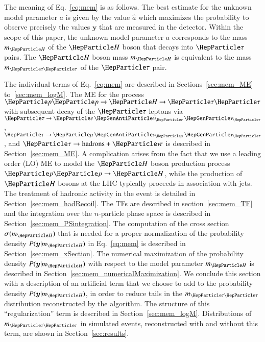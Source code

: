 The meaning of Eq.~\ref{eq:mem} is as follows.
The best estimate for the unknown model parameter $a$ is given by the
value $\hat{a}$ which maximizes the probability to observe precisely the 
values $\bm{y}$ that are measured in the detector. 
Within the scope of this paper, the unknown model parameter $a$
corresponds to the mass $m_{\PHiggs}$ of the $\PHiggs$ boson that decays into $\Pgt$ pairs.
The $\PHiggs$ boson mass $m_{\PHiggs}$ is equivalent to the mass $m_{\Pgt\Pgt}$ of the $\Pgt$ pair.

The individual terms of Eq.~\ref{eq:mem} are described in
Sections~\ref{sec:mem_ME} to~\ref{sec:mem_logM}.
The ME for the process $\Pp\Pp \to \PHiggs \to \Pgt\Pgt$
with subsequent decay of the $\Pgt$ leptons 
via $\Pgt \to \enunu$, $\Pgt \to \mununu$, and $\Pgt \to \textrm{hadrons} + \Pnut$
is described in Section~\ref{sec:mem_ME}.
A complication arises from the fact that we use a leading order (LO)
ME to model the $\PHiggs$ boson production process $\Pp\Pp \to
\PHiggs$, while the production of $\PHiggs$ bosons at the LHC typically
proceeds in association with jets.
The treatment of hadronic activity in the event is detailed in Section~\ref{sec:mem_hadRecoil}.
The TFs are described in section~\ref{sec:mem_TF} and
the integration over the $n$-particle phase space is described in
Section~\ref{sec:mem_PSintegration}.
The computation of the cross section $\sigma(m_{\PHiggs})$ that is needed for a proper normalization of the probability density $P(\bm{y}|m_{\PHiggs})$
in Eq.~\ref{eq:mem} is described in Section~\ref{sec:mem_xSection}.
The numerical maximization of the probability density $P(\bm{y}|m_{\PHiggs})$
with respect to the model parameter $m_{\PHiggs}$ is described in
Section~\ref{sec:mem_numericalMaximization}.
We conclude this section with a description of an artificial term that we
choose to add to the probability density $P(\bm{y}|m_{\PHiggs})$, in
order to reduce tails in the $m_{\Pgt\Pgt}$ distribution reconstructed
by the algorithm. The structure of this ``regularization'' term is described in
Section~\ref{sec:mem_logM}.
Distributions of $m_{\Pgt\Pgt}$ in simulated events,
reconstructed with and without this term, are shown in Section~\ref{sec:results}.




